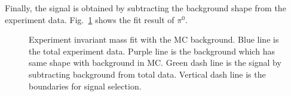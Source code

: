 Finally, the signal is obtained by subtracting the background shape from the experiment data. Fig.~\ref{fig:pi0_fit} shows the fit result of $\pi^0$.  
\begin{figure}[H]
  \centering     
  \caption{Experiment invariant mass fit with the MC background. Blue line is the total experiment data. Purple line is the background which has same shape with background in MC. Green dash line is the signal by subtracting background from total data. Vertical dash line is the boundaries for signal selection. }
  \label{fig:pi0_fit}
\end{figure}


